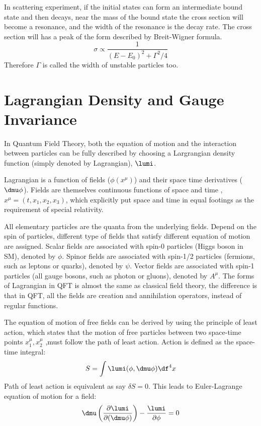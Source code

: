  In scattering experiment, if the initial states can form an intermediate bound state and then decays, near the mass of the bound state the cross section will become a resonance, and the width of the resonance is the decay rate. The cross section will has a peak of the form described by Breit-Wigner formula.
 \begin{equation}
 \sigma \propto \frac{1}{(E-E_0)^2+\Gamma^2/4}
 \end{equation} 
 Therefore $\Gamma$ is called the width of unstable particles too.
 
 \section{Lagrangian Density and Gauge Invariance}
 In Quantum Field Theory, both the equation of motion and the interaction between particles can be fully described by choosing a Largrangian density function (simply denoted by Lagrangian), $\lumi$. 
 
 Lagrangian is a function of fields ($\phi(x^{\mu})$) and their space time derivatives ($\dmu\phi$). Fields are themselves continuous functions of space and time , $x^{\mu} = (t,x_1,x_2,x_3)$, which explicitly put space and time in equal footings as the requirement of special relativity. 
 
 All elementary particles are the quanta from the underlying fields. Depend on the spin of particles, different type of fields that satisfy different equation of motion are assigned. Scalar fields are associated with spin-0 particles (Higgs boson in SM), denoted by $\phi$. Spinor fields are associated with spin-1/2 particles (fermions, such as leptons or quarks), denoted by $\psi$. Vector fields are associated with spin-1 particles (all gauge bosons, such as photon or gluons), denoted by $A^\mu$. The forms of Lagrangian in QFT is almost the same as classical field theory, the difference is that in QFT, all the fields are creation and annihilation operators, instead of regular functions.
 
 The equation of motion of free fields can be derived by using the principle of least action, which states that the motion of free particles between two space-time points $x_1^{\mu},x_2^{\mu}$ ,must follow the path of least action. Action is defined as the space-time integral:
 \begin{equation}
 S=\int\lumi(\phi,\dmu\phi)\df^4x
 \end{equation} 
 Path of least action is equivalent as say $\delta S=0$. This leads to Euler-Lagrange equation of motion for a field:
 \begin{equation}
 \dmu\left(\frac{\partial\lumi}{\partial(\dmu\phi)}\right)-\frac{\lumi}{\partial\phi}=0
 \end{equation}
 
